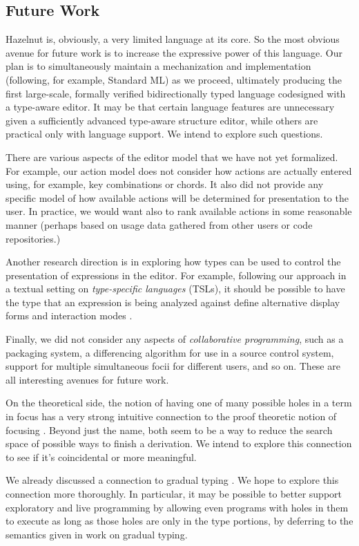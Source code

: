 \documentclass{llncs}
\begin{document}
\subsection{Future Work}
Hazelnut is, obviously, a very limited language at its core. So the most obvious avenue for future work is to increase the expressive power of this language. Our plan is to simultaneously maintain a mechanization and implementation (following, for example, Standard ML) as we proceed, ultimately producing the first large-scale, formally verified bidirectionally typed language codesigned with a type-aware editor. It may be that certain language features are unnecessary given a sufficiently advanced type-aware structure editor, while others are practical only with language support. We intend to explore such questions.

There are various aspects of the editor model that we have not yet formalized. For example, our action model does not consider how actions are actually entered using, for example, key combinations or chords. It also did not provide any specific model of how available actions will be determined for presentation to the user. In practice, we would want also to rank available actions in some reasonable manner (perhaps based on usage data gathered from other users or code repositories.)

Another research direction is in exploring how types can be used to control the presentation of expressions in the editor. For example, following our approach in a textual setting on \emph{type-specific languages} (TSLs), it should be possible to have the type that an expression is being analyzed against define alternative display forms and interaction modes \cite{TSLs}.

Finally, we did not consider any aspects of \emph{collaborative programming}, such as a packaging system, a differencing algorithm for use in a source control system, support for multiple simultaneous focii for different users, and so on. These are all interesting avenues for future work.


On the theoretical side, the notion of having one of many possible holes in a term in focus has a very strong intuitive connection
  to the proof theoretic notion of focusing \cite{Simmons11tr}. Beyond just
  the name, both seem to be a way to reduce the search space of possible
  ways to finish a derivation. We intend to explore this connection to see
  if it's coincidental or more meaningful.


  We already discussed a connection to gradual typing \cite{Siek06a}. We hope to explore this connection more thoroughly. In particular, it may be possible to better support exploratory and live programming by allowing even programs with holes in them to execute as long as those holes are only in the type portions, by deferring to the semantics given in work on gradual typing.
\end{document}
